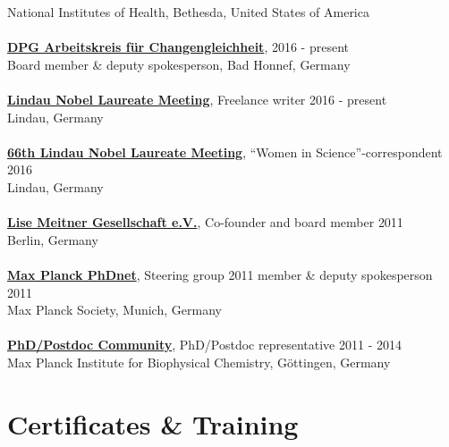 \documentclass[margin,line]{res}
\begin{document}
\begin{resume}
National Institutes of Health, Bethesda, United States of America\\
\vspace*{-3mm}\\
{\bf  \href{https://www.dpg-physik.de/vereinigungen/fachuebergreifend/ak/akc}{DPG Arbeitskreis für Changengleichheit}}, \hfill {2016 - present}\\
Board member \& deputy spokesperson, Bad Honnef, Germany\\
\vspace*{-3mm}\\
{\bf \href{https://www.lindau-nobel.org/blog-women-in-research-at-lino70/}{Lindau Nobel Laureate Meeting}}, Freelance writer \hfill {2016 - present}\\
Lindau, Germany\\
\vspace*{-3mm}\\
{\bf \href{https://www.br.de/fernsehen/ard-alpha/sendungen/alpha-forum/alpha-forum-extra-spitzenforschung-102.html}{66th Lindau Nobel Laureate Meeting}}, “Women in Science”-correspondent \hfill {2016}\\
Lindau, Germany\\
\vspace*{-3mm}\\
{\bf \href{https://www.lise-meitner-gesellschaft.org/}{Lise Meitner Gesellschaft e.V.}}, Co-founder and board member \hfill {2011}\\
Berlin, Germany\\
\vspace*{-3mm}\\
{\bf \href{https://www.phdnet.mpg.de/home}{Max Planck PhDnet}}, Steering group 2011 member \& deputy spokesperson \hfill {2011}\\
Max Planck Society, Munich, Germany\\
\vspace*{-3mm}\\
{\bf  \href{https://www.mpibpc.mpg.de/phdcom}{PhD/Postdoc Community}}, PhD/Postdoc representative \hfill {2011 - 2014}\\
Max Planck Institute for Biophysical Chemistry, Göttingen, Germany\\


\section{\sc Certificates \& Training}


\end{resume}
\end{document}
